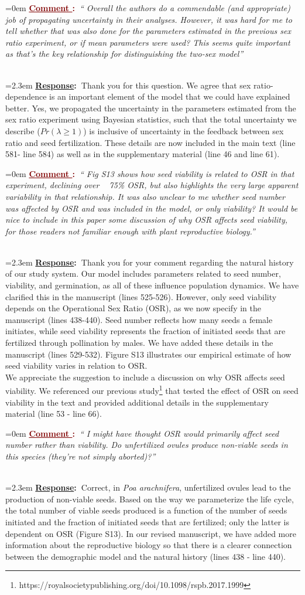 \documentclass[12pt]{article}
\newcounter{cN}
\newcommand{\comment}[1]{
	\vspace{2em}
	\refstepcounter{cN} %
	\noindent \hangindent=0em \textbf{\textcolor{Maroon}{\uline{Comment \thecN}:~}}\emph{``#1''}
	}
\newcommand{\response}[1]{
	\\[0.25em]
	\hangindent=2.3em \textbf{\textcolor{NavyBlue}{\uline{Response}:~}}#1
	}
\begin{document}
\comment{ Overall the authors do a commendable (and appropriate) job of propagating uncertainty in their analyses. However, it was hard for me to tell whether that was also done for the parameters estimated in the previous sex ratio experiment, or if mean parameters were used? This seems quite important as that’s the key
relationship for distinguishing the two-sex model}
\response{Thank you for this question. We agree that sex ratio-dependence is an important element of the model that we could have explained better. Yes, we propagated the uncertainty in the parameters estimated from the sex ratio experiment using Bayesian statistics, such that the total uncertainty we describe ($Pr(\lambda \ge 1)$) is inclusive of uncertainty in the feedback between sex ratio and seed fertilization. 
These details are now included in the main text (line 581- line 584) as well as in the supplementary material (line 46 and line 61).}

\comment{ Fig S13 shows how seed viability is related to OSR in that experiment, declining over ~ 75\% OSR, but also highlights
the very large apparent variability in that relationship. It was also unclear to me whether seed number was affected by OSR and was included in the model, or only
viability? It would be nice to include in this paper some discussion of why OSR affects seed viability, for those readers not familiar enough with plant reproductive
biology.}
\response{Thank you for your comment regarding the natural history of our study system. 
Our model includes parameters related to seed number, viability, and germination, as all of these influence population dynamics. 
We have clarified this in the manuscript (lines 525-526).
However, only seed viability depends on the Operational Sex Ratio (OSR), as we now specify in the manuscript (lines 438-440). 
Seed number reflects how many seeds a female initiates, while seed viability represents the fraction of initiated seeds that are fertilized through pollination by males.
We have added these details in the manuscript (lines 529-532).
Figure S13 illustrates our empirical estimate of how seed viability varies in relation to OSR. 
\\
We appreciate the suggestion to include a discussion on why OSR affects seed viability. We referenced our previous study\footnote{https://royalsocietypublishing.org/doi/10.1098/rspb.2017.1999} that tested the effect of OSR on seed viability in the text and provided additional details in the supplementary material (line 53 - line 66).
}

\comment{ I might have thought OSR would primarily affect seed number rather than viability. Do unfertilized ovules produce non-viable seeds in this species (they’re not simply aborted)?}
\response{Correct, in \emph{Poa arachnifera}, unfertilized ovules lead to the production of non-viable seeds. 
Based on the way we parameterize the life cycle, the total number of viable seeds produced is a function of the number of seeds initiated and the fraction of initiated seeds that are fertilized; only the latter is dependent on OSR (Figure S13). 
In our revised manuscript, we have added more information about the reproductive biology so that there is a clearer connection between the demographic model and the natural history (lines 438 - line 440). }
\end{document}
